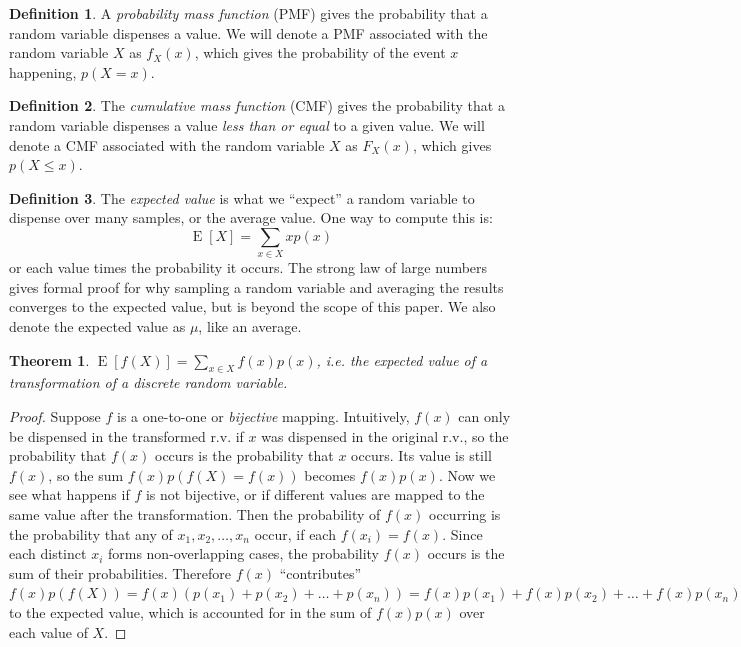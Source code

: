 \documentclass[11pt, oneside]{article}
\DeclareMathOperator{\E}{E}
\theoremstyle{plain}
\newtheorem{theorem}{Theorem}[section]
\theoremstyle{definition}
\newtheorem{definition}{Definition}[section]
\begin{document}
\begin{definition}
  A \textit{probability mass function} (PMF) gives the probability that a
  random variable dispenses a value. We will denote a PMF associated with
  the random variable \( X \) as \( f_X(x) \), which gives the probability
  of the event \( x \) happening, \( p(X = x) \).
\end{definition}

\begin{definition}
  The \textit{cumulative mass function} (CMF) gives the probability that a
  random variable dispenses a value \textit{less than or equal} to a given
  value. We will denote a CMF associated with the random variable \( X \) as
  \( F_X(x) \), which gives \( p(X \leq x) \).
\end{definition}

\begin{definition}
  The \textit{expected value} is what we \enquote{expect} a random variable
  to dispense over many samples, or the average value. One way to compute
  this is: \[ \E[X] = \sum_{x \in X} x p(x) \] or each value times the
  probability it occurs. The strong law of large numbers gives formal proof
  for why sampling a random variable and averaging the results converges to
  the expected value, but is beyond the scope of this paper. We also denote
  the expected value as \( \mu \), like an average.
\end{definition}

\begin{theorem}
  \( \E[f(X)] = \sum_{x \in X} f(x) p(x) \), i.e. the expected value of a
  transformation of a discrete random variable.
\end{theorem}
\begin{proof}
  Suppose \( f \) is a one-to-one or \textit{bijective} mapping. Intuitively,
  \( f(x) \) can only be dispensed in the transformed r.v. if \( x \) was
  dispensed in the original r.v., so the probability that \( f(x) \) occurs
  is the probability that \( x \) occurs. Its value is still \( f(x) \), so
  the sum \( f(x) p(f(X) = f(x)) \) becomes \( f(x) p(x) \). Now we see what
  happens if \( f \) is not bijective, or if different values are mapped to
  the same value after the transformation. Then the probability of \( f(x)
  \) occurring is the probability that any of \( x_1, x_2, \dots, x_n \)
  occur, if each \( f(x_i) = f(x) \). Since each distinct \( x_i \) forms
  non-overlapping cases, the probability \( f(x) \) occurs is the sum of
  their probabilities. Therefore \( f(x) \) \enquote{contributes} \( f(x)
  p(f(X)) = f(x) (p(x_1) + p(x_2) + \dots + p(x_n)) = f(x) p(x_1) + f(x)
  p(x_2) + \dots + f(x) p(x_n) \) to the expected value, which is accounted
  for in the sum of \( f(x) p(x) \) over each value of \( X \).
\end{proof}
\end{document}
